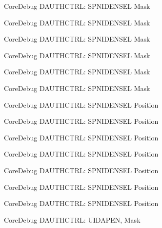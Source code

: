 \begin{DoxyRefList}
\label{deprecated__deprecated000142}%
%
Core\+Debug D\+A\+U\+T\+H\+C\+T\+RL\+: S\+P\+N\+I\+D\+E\+N\+S\+EL Mask 

\label{deprecated__deprecated000218}%
%
Core\+Debug D\+A\+U\+T\+H\+C\+T\+RL\+: S\+P\+N\+I\+D\+E\+N\+S\+EL Mask 

\label{deprecated__deprecated000281}%
%
Core\+Debug D\+A\+U\+T\+H\+C\+T\+RL\+: S\+P\+N\+I\+D\+E\+N\+S\+EL Mask 

\label{deprecated__deprecated000360}%
%
Core\+Debug D\+A\+U\+T\+H\+C\+T\+RL\+: S\+P\+N\+I\+D\+E\+N\+S\+EL Mask 

\label{deprecated__deprecated000436}%
%
Core\+Debug D\+A\+U\+T\+H\+C\+T\+RL\+: S\+P\+N\+I\+D\+E\+N\+S\+EL Mask 

\label{deprecated__deprecated000539}%
%
Core\+Debug D\+A\+U\+T\+H\+C\+T\+RL\+: S\+P\+N\+I\+D\+E\+N\+S\+EL Mask  
\item[Member \mbox{\hyperlink{group__CMSIS__CoreDebug_ga866734a8e4bec2d6cf091e265c6c0f3d}{Core\+Debug\+\_\+\+D\+A\+U\+T\+H\+C\+T\+R\+L\+\_\+\+S\+P\+N\+I\+D\+E\+N\+S\+E\+L\+\_\+\+Pos}} ]\label{deprecated__deprecated000087}%
%
Core\+Debug D\+A\+U\+T\+H\+C\+T\+RL\+: S\+P\+N\+I\+D\+E\+N\+S\+EL Position 

\label{deprecated__deprecated000141}%
%
Core\+Debug D\+A\+U\+T\+H\+C\+T\+RL\+: S\+P\+N\+I\+D\+E\+N\+S\+EL Position 

\label{deprecated__deprecated000217}%
%
Core\+Debug D\+A\+U\+T\+H\+C\+T\+RL\+: S\+P\+N\+I\+D\+E\+N\+S\+EL Position 

\label{deprecated__deprecated000280}%
%
Core\+Debug D\+A\+U\+T\+H\+C\+T\+RL\+: S\+P\+N\+I\+D\+E\+N\+S\+EL Position 

\label{deprecated__deprecated000359}%
%
Core\+Debug D\+A\+U\+T\+H\+C\+T\+RL\+: S\+P\+N\+I\+D\+E\+N\+S\+EL Position 

\label{deprecated__deprecated000435}%
%
Core\+Debug D\+A\+U\+T\+H\+C\+T\+RL\+: S\+P\+N\+I\+D\+E\+N\+S\+EL Position 

\label{deprecated__deprecated000538}%
%
Core\+Debug D\+A\+U\+T\+H\+C\+T\+RL\+: S\+P\+N\+I\+D\+E\+N\+S\+EL Position  
\item[Member \mbox{\hyperlink{group__CMSIS__CoreDebug_gad69e7195bbc5074466387d9c4d8bd529}{Core\+Debug\+\_\+\+D\+A\+U\+T\+H\+C\+T\+R\+L\+\_\+\+U\+I\+D\+A\+P\+E\+N\+\_\+\+Msk}} ]\label{deprecated__deprecated000082}%
%
Core\+Debug D\+A\+U\+T\+H\+C\+T\+RL\+: U\+I\+D\+A\+P\+EN, Mask 


\end{DoxyRefList}
